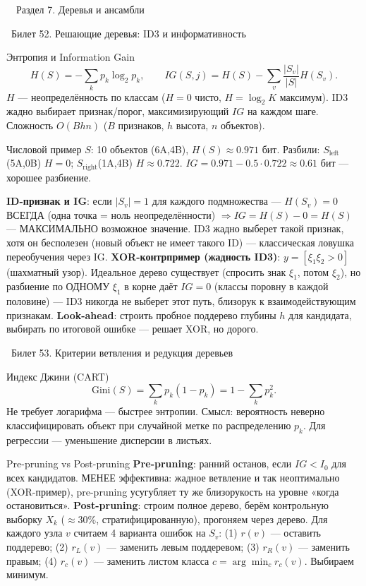\documentclass[12pt, a4paper]{article}
\newcommand{\razdel}[2]{%
  \clearpage%
  \noindent\colorbox{razdelcol}{\parbox{\dimexpr\linewidth-2\fboxsep\relax}{%
    \color{white}\LARGE\bfseries\strut\ \ Раздел #1. #2%
  }}%
  \vspace{10pt}%
}
\newcommand{\bilet}[2]{%
  \vspace{10pt}%
  \noindent\colorbox{qcolor}{\parbox{\dimexpr\linewidth-2\fboxsep\relax}{%
    \color{white}\large\bfseries\strut\ Билет #1. #2%
  }}%
  \nopagebreak\vspace{5pt}\par\nopagebreak%
}
\begin{document}
\razdel{7}{Деревья и ансамбли}

\bilet{52}{Решающие деревья: ID3 и информативность}

\begin{defbox}{Энтропия и Information Gain}
\[
  H(S) = -\sum_k p_k\log_2 p_k, \qquad IG(S,j) = H(S) - \sum_v \frac{|S_v|}{|S|}H(S_v).
\]
$H$ --- неопределённость по классам ($H{=}0$ чисто, $H{=}\log_2 K$ максимум). ID3 жадно выбирает признак/порог, максимизирующий $IG$ на каждом шаге. Сложность $O(B h n)$ ($B$ признаков, $h$ высота, $n$ объектов).
\end{defbox}

\begin{exbox}{Числовой пример}
$S$: 10 объектов (6A,4B), $H(S)\approx0.971$ бит. Разбили: $S_{\text{left}}$(5A,0B) $H{=}0$; $S_{\text{right}}$(1A,4B) $H\approx0.722$. $IG=0.971-0.5\cdot0.722\approx0.61$ бит --- хорошее разбиение.
\end{exbox}

\begin{fishkabox}
\textbf{ID-признак и IG}: если $|S_v|{=}1$ для каждого подмножества --- $H(S_v){=}0$ ВСЕГДА (одна точка = ноль неопределённости) $\Rightarrow IG=H(S)-0=H(S)$ --- МАКСИМАЛЬНО возможное значение. ID3 жадно выберет такой признак, хотя он бесполезен (новый объект не имеет такого ID) --- классическая ловушка переобучения через IG.
\textbf{XOR-контрпример (жадность ID3)}: $y=[\xi_1\xi_2>0]$ (шахматный узор). Идеальное дерево существует (спросить знак $\xi_1$, потом $\xi_2$), но разбиение по ОДНОМУ $\xi_1$ в корне даёт $IG=0$ (классы поровну в каждой половине) --- ID3 никогда не выберет этот путь, близорук к взаимодействующим признакам. \textbf{Look-ahead}: строить пробное поддерево глубины $h$ для кандидата, выбирать по итоговой ошибке --- решает XOR, но дорого.
\end{fishkabox}

\bilet{53}{Критерии ветвления и редукция деревьев}

\begin{defbox}{Индекс Джини (CART)}
\[
  \text{Gini}(S) = \sum_k p_k(1-p_k) = 1-\sum_k p_k^2.
\]
Не требует логарифма --- быстрее энтропии. Смысл: вероятность неверно классифицировать объект при случайной метке по распределению $p_k$. Для регрессии --- уменьшение дисперсии в листьях.
\end{defbox}

\begin{propbox}{Pre-pruning vs Post-pruning}
\textbf{Pre-pruning}: ранний останов, если $IG<I_0$ для всех кандидатов. МЕНЕЕ эффективна: жадное ветвление и так неоптимально (XOR-пример), pre-pruning усугубляет ту же близорукость на уровне «когда остановиться».
\textbf{Post-pruning}: строим полное дерево, берём контрольную выборку $X_k$ ($\approx$30\%, стратифицированную), прогоняем через дерево. Для каждого узла $v$ считаем 4 варианта ошибок на $S_v$: (1) $r(v)$ --- оставить поддерево; (2) $r_L(v)$ --- заменить левым поддеревом; (3) $r_R(v)$ --- заменить правым; (4) $r_c(v)$ --- заменить листом класса $c=\arg\min_c r_c(v)$. Выбираем минимум.
\end{propbox}
\end{document}
